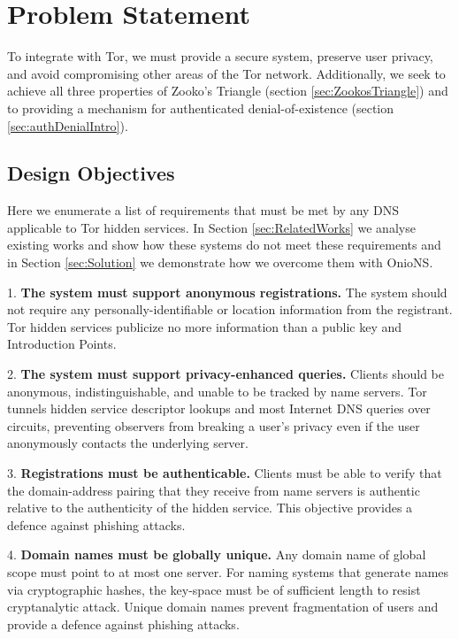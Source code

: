 \documentclass[conference]{IEEEtran}
\begin{document}
\section{Problem Statement}
\label{sec:problemStatement}

To integrate with Tor, we must provide a secure system, preserve user privacy, and avoid compromising other areas of the Tor network. Additionally, we seek to achieve all three properties of Zooko's Triangle (section \ref{sec:ZookosTriangle}) and to providing a mechanism for authenticated denial-of-existence (section \ref{sec:authDenialIntro}).

\subsection{Design Objectives}

Here we enumerate a list of requirements that must be met by any DNS applicable to Tor hidden services. In Section \ref{sec:RelatedWorks} we analyse existing works and show how these systems do not meet these requirements and in Section \ref{sec:Solution} we demonstrate how we overcome them with OnioNS.

1. \textbf{The system must support anonymous registrations.} The system should not require any personally-identifiable or location information from the registrant. Tor hidden services publicize no more information than a public key and Introduction Points.

2. \textbf{The system must support privacy-enhanced queries.} Clients should be anonymous, indistinguishable, and unable to be tracked by name servers. Tor tunnels hidden service descriptor lookups and most Internet DNS queries over circuits, preventing observers from breaking a user's privacy even if the user anonymously contacts the underlying server.

3. \textbf{Registrations must be authenticable.} Clients must be able to verify that the domain-address pairing that they receive from name servers is authentic relative to the authenticity of the hidden service. This objective provides a defence against phishing attacks.

4. \textbf{Domain names must be globally unique.} Any domain name of global scope must point to at most one server. For naming systems that generate names via cryptographic hashes, the key-space must be of sufficient length to resist cryptanalytic attack. Unique domain names prevent fragmentation of users and provide a defence against phishing attacks.
\end{document}
